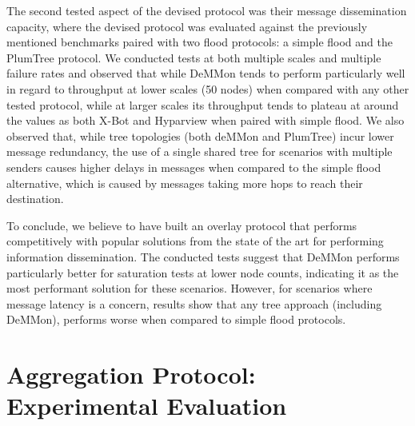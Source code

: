 The second tested aspect of the devised protocol was their message dissemination capacity, where the devised protocol was evaluated against the previously mentioned benchmarks paired with two flood protocols: a simple flood and the PlumTree protocol. We conducted tests at both multiple scales and multiple failure rates and observed that while DeMMon tends to perform particularly well in regard to throughput at lower scales (50 nodes) when compared with any other tested protocol, while at larger scales its throughput tends to plateau at around the values as both X-Bot and Hyparview when paired with simple flood. We also observed that, while tree topologies (both deMMon and PlumTree) incur lower message redundancy, the use of a single shared tree for scenarios with multiple senders causes higher delays in messages when compared to the simple flood alternative, which is caused by messages taking more hops to reach their destination.

To conclude, we believe to have built an overlay protocol that performs competitively with popular solutions from the state of the art for performing information dissemination. The conducted tests suggest that DeMMon performs particularly better for saturation tests at lower node counts, indicating it as the most performant solution for these scenarios. However, for scenarios where message latency is a concern, results show that any tree approach (including DeMMon), performs worse when compared to simple flood protocols.


\section{Aggregation Protocol: Experimental Evaluation} \label{sec:agg_proto_eval}




